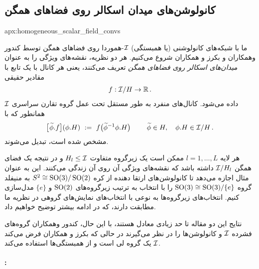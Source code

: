 \toclesslab\subsection{کانولوشن‌های میدان اسکالر روی فضاهای همگن}{apx:homogeneous_scalar_field_convs}

ما با شبکه‌های کانولوشنی (یا همبستگی) $\mathcal{I}$-هموردا روی فضاهای همگن توسط کندور وهمکاران\cite{Kondor2018-GENERAL} و بکرز و همکاران\cite{bekkers2020bspline} شروع می‌کنیم.
هر دو نظریه، نقشه‌های ویژگی را به عنوان \emph{میدان‌های اسکالر روی فضاهای همگن} تعریف می‌کنند، یعنی هر کانال با یک تابع با مقادیر حقیقی
\begin{align}\label{eq:scalar_field_homogeneous_space}
	f: \mathcal{I}/H \to \mathbb{R} \,.
\end{align}
داده می‌شود. کانال‌های منفرد به طور مستقل تحت عمل گروه تقارن سراسری $\mathcal{I}$ همانطور که با
\begin{align}\label{eq:group_action_homogeneous_space_scalar_field}
	\big[\mkern1mu \widetilde{\phi}.f\big] (\phi.H)\ :=\ f\big( \widetilde{\phi}^{-1} \phi.H \big)
	\qquad\ \widetilde{\phi}\in H,\ \ \ \phi.H\in \mathcal{I}/H \,.
\end{align}
مشخص شده است، تبدیل می‌شوند.

هر لایه $l = 1,\dots, L$ ممکن است یک زیرگروه متفاوت $H_l \leq\mathcal{I}$ و در نتیجه یک فضای همگن $\mathcal{I}/H_l$ داشته باشد که نقشه‌های ویژگی آن روی آن زندگی می‌کنند.
این به عنوان مثال اجازه می‌دهد تا کانولوشن‌های ارتقا دهنده از کره $S^2 \cong \operatorname{SO}(3)/\operatorname{SO}(2)$ به منیفلد گروه $\operatorname{SO}(3) \cong \operatorname{SO}(3)/\{e\}$ را با انتخاب به ترتیب زیرگروه‌های $\operatorname{SO}(2)$ و $\{e\}$ مدل‌سازی کنیم.
انتخاب‌های زیرگروه‌ها به نوعی با انتخاب‌های نمایش‌های گروهی در نظریه ما مطابقت دارند، که در ادامه بیشتر توضیح خواهیم داد.

نتایج این دو مقاله تا حد زیادی معادل هستند، با این حال،
کندور وهمکاران\cite{Kondor2018-GENERAL} گروه‌های فشرده $\mathcal{I}$ و کانولوشن‌ها را در نظر می‌گیرند
در حالی که بکرز و همکاران\cite{bekkers2020bspline} فرض می‌کند $\mathcal{I}$ یک گروه لی است و از همبستگی‌ها استفاده می‌کند.



\paragraph{:}

